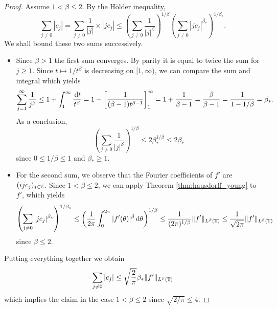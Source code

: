 \begin{proof}
  Assume $1 < \beta \leq 2$.
  By the H\"older inequality,
  \begin{equation*}
    \sum_{j \neq 0} |c_j|
    = \sum_{j \neq 0} \frac{1}{|j|} \times |j c_j|
    \leq
    \left(\sum_{j \neq 0} \frac{1}{|j|^\beta} \right)^{1/\beta}
    \left(\sum_{j \neq 0} |j c_j|^{\beta_*} \right)^{1/\beta_*}.
  \end{equation*}
  We shall bound these two sums successively.
  \begin{itemize}
    \item   Since $\beta>1$ the first sum converges. By parity it is equal to twice the sum for $j \geq 1$.
  Since $t \mapsto 1/t^\beta$
  is decreasing on $[1,\infty)$, we can compare the sum and integral which yields
  \begin{equation*}
    \sum_{j =1}^\infty \frac{1}{j^\beta}
    \leq 1 + \int_1^\infty \frac{\, \mathrm{d} t}{t^\beta}
    = 1 - \left[ \frac{1}{(\beta-1)t^{\beta-1}} \right]_1^\infty
    = 1 + \frac{1}{\beta - 1}
    = \frac{\beta}{\beta - 1} = \frac{1}{1 - 1/\beta} = \beta_*.
  \end{equation*}
  As a conclusion,
  \begin{equation*}
    \left(\sum_{j \neq 0} \frac{1}{|j|^\beta} \right)^{1/\beta}
    \leq 2 \beta_*^{1/\beta} \leq 2 \beta_*
  \end{equation*}
  since $0 \leq 1/\beta \leq 1$ and $\beta_* \geq 1$.
  \item For the second sum, we observe that the Fourier coefficients of $f'$
  are $(i j c_j)_{j \in \mathbb{Z}}$. Since $1 < \beta \leq 2$, we can
  apply Theorem \ref{thm:hausdorff_young} to $f'$, which yields
  \begin{equation*}
    \left(\sum_{j \neq 0} |j c_j|^{\beta_*} \right)^{1/\beta_*}
    \leq
    \left(\frac{1}{2 \pi} \int_0^{2 \pi} |f'(\theta)|^\beta \, \mathrm{d} \theta\right)^{1/\beta}
    \leq \frac{1}{(2 \pi)^{1/\beta}} \|f'\|_{L^\beta(\mathbb{T})}
    \leq \frac{1}{\sqrt{2 \pi}} \|f'\|_{L^\beta(\mathbb{T})}
  \end{equation*}
  since $\beta \leq 2$.
  \end{itemize}
  Putting everything together we obtain
  \begin{equation*}
    \sum_{j \neq 0} |c_j|
    \leq \sqrt{\frac{2}{\pi}} \beta_*  \|f'\|_{L^\beta(\mathbb{T})}
  \end{equation*}
  which implies the claim in the case $1 < \beta \leq 2$ since $\sqrt{2/\pi} \leq 4$.


\end{proof}
